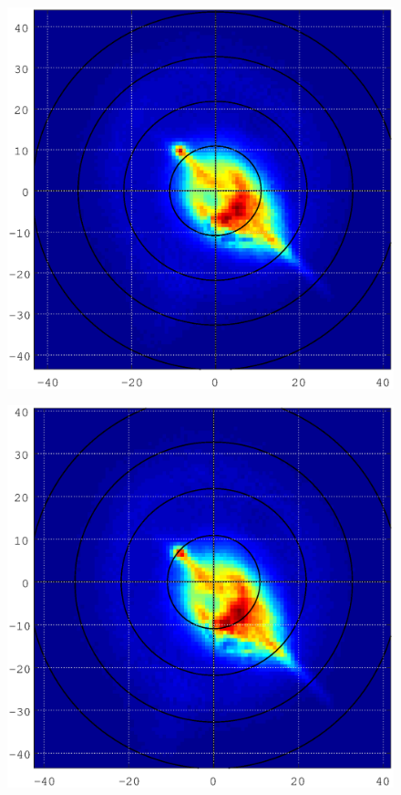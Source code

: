 \begin{figure}
\centering
\begin{minipage}{.5\textwidth}
  \centering
  \includegraphics[width=1\textwidth]{Graphics/centre_calibration_before.eps}
  \label{fig:test1}
\end{minipage}%
\begin{minipage}{.5\textwidth}
  \centering
  \includegraphics[width=1\textwidth]{Graphics/centre_calibration_after.eps}
  \label{fig:test2}
\end{minipage}
\end{figure}

